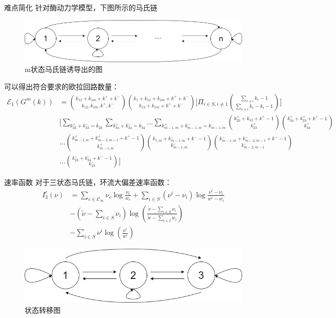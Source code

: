 \documentclass{beamer}
\begin{document}
	\begin{frame}{难点简化}
		针对酶动力学模型，下图所示的马氏链
		\begin{figure}[h] \label{fi}
			\centering
			\includegraphics[scale=0.3]{n-state2.png}
			\caption*{m状态马氏链诱导出的图}
		\end{figure}
		可以得出符合要求的欧拉回路数量：
		\tiny{
		\begin{align*}
			\mathcal{E}_1 (G^m(k)) &= 
			\binom{k_{12}+k_{1m}+k^{+}+k^{-}}{k_{12}, k_{1m}, k^{+}, k^{-}} 
			\binom{k_{1}+k_{12}+k_{1m}+k^{+}+k^{-}}{k_{12}+k_{1m}+k^{+}+k^{-}}
			\biggl[\Pi_{i\in S, i\neq 1} \binom{\sum_{c \ni i} k_{c} - 1}{\sum_{c \ni i} k_{c} - k_{i} - 1}\biggr]\\
			&\biggl[\sum_{k_{23}^{+}+k_{23}^{-}=k_{23}} \sum_{k_{34}^{+}+k_{34}^{-}=k_{34}}
			\dots \sum_{k_{m-1,m}^{+}+k_{m-1,m}^{-}=k_{m-1,m}}
			\binom{k_{23}^{+}+k_{12}+k^{+}-1}{k_{23}^{+}} \binom{k_{34}^{+}+k_{23}^{+}+k^{+}-1}{k_{34}^{+}} \\
			&\dots \binom{k_{m-1, m}^{+}+ k^{+}_{m-2, m-1} + k^{+}  -1}{k_{m-1, m}^{+}} \binom{k_{1, m} + k_{m-1, m}^{-} + k^{-} -1}{k_{m-1, m}^{-}} \binom{k_{m-1, m}^{-} + k_{m-2, m-1}^{-} + k^{-} - 1}{k_{m-2, m-1}^{-}} \\
			&\dots \binom{k_{23}^{-} + k_{34}^{-} + k^{-} - 1}{k_{23}^{-}}\biggr]
		\end{align*}}
	\end{frame}

	\begin{frame}{速率函数}
		对于三状态马氏链，环流大偏差速率函数：
		\begin{align*}
			I_3^c(\nu) &= \sum_{c \in \mathcal{C}_{\infty}} \nu_{c} \log \frac{\nu_{c}}{w_c} + \sum_{i\in S}(\nu^i - \nu_i)\log \frac{\nu^i - \nu_i}{w^i - w_i} \\
			&-(\tilde{\nu} - \sum_{i\in S}\nu_i)\log(\frac{\tilde{\nu} - \sum_{i\in S}\nu_i}{\tilde{w} - \sum_{i\in I}w_i}) \\
			&-\sum_{i\in S} \nu^i \log (\frac{\nu^i}{w^i})
		\end{align*}

		\begin{figure}[h]
			\centering
			\includegraphics[scale=0.3]{3-state.png}
			\caption*{状态转移图}
		\end{figure}
	\end{frame}
\end{document}
